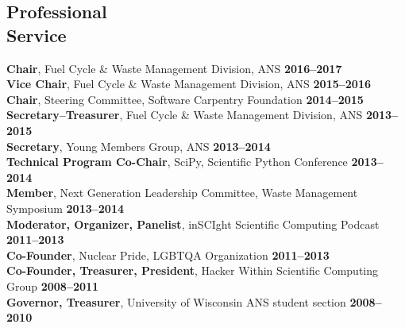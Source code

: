 \documentclass[margin,line]{resume}
\begin{document}
\begin{resume}
    \section{\mysidestyle Professional\\Service}
		\textbf{Chair}, Fuel Cycle \& Waste Management Division, ANS  \hfill \textbf{2016--2017}\vspace{.5mm}\\%
		\textbf{Vice Chair}, Fuel Cycle \& Waste Management Division, ANS  \hfill \textbf{2015--2016}\vspace{.5mm}\\%
		\textbf{Chair}, Steering Committee, Software Carpentry Foundation   \hfill \textbf{2014--2015}\vspace{.5mm}\\%
		\textbf{Secretary--Treasurer}, Fuel Cycle \& Waste Management Division, ANS  \hfill \textbf{2013--2015}\vspace{.5mm}\\%
		\textbf{Secretary}, Young Members Group, ANS  \hfill \textbf{2013--2014}\vspace{.5mm}\\%
		\textbf{Technical Program Co-Chair}, SciPy, Scientific Python Conference   \hfill \textbf{2013--2014}\vspace{.5mm}\\%
		\textbf{Member}, Next Generation Leadership Committee, Waste Management Symposium  \hfill \textbf{2013--2014}\vspace{.5mm}\\%
		\textbf{Moderator, Organizer, Panelist}, inSCIght Scientific Computing Podcast  \hfill \textbf{2011--2013}\vspace{.5mm}\\%
		\textbf{Co-Founder}, Nuclear Pride, LGBTQA Organization  \hfill \textbf{2011--2013}\vspace{.5mm}\\%
		\textbf{Co-Founder, Treasurer, President}, Hacker Within Scientific Computing Group  \hfill \textbf{2008--2011}\vspace{.5mm}\\%
		\textbf{Governor, Treasurer}, University of Wisconsin ANS student section  \hfill \textbf{2008--2010}\vspace{.5mm}%




\end{resume}
\end{document}
